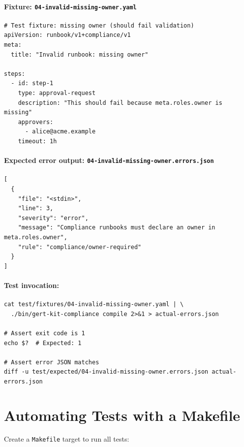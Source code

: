 \paragraph{Fixture: \texttt{04-invalid-missing-owner.yaml}}

\begin{verbatim}
# Test fixture: missing owner (should fail validation)
apiVersion: runbook/v1+compliance/v1
meta:
  title: "Invalid runbook: missing owner"

steps:
  - id: step-1
    type: approval-request
    description: "This should fail because meta.roles.owner is missing"
    approvers:
      - alice@acme.example
    timeout: 1h
\end{verbatim}

\paragraph{Expected error output: \texttt{04-invalid-missing-owner.errors.json}}

\begin{verbatim}
[
  {
    "file": "<stdin>",
    "line": 3,
    "severity": "error",
    "message": "Compliance runbooks must declare an owner in meta.roles.owner",
    "rule": "compliance/owner-required"
  }
]
\end{verbatim}

\paragraph{Test invocation:}

\begin{verbatim}
cat test/fixtures/04-invalid-missing-owner.yaml | \
  ./bin/gert-kit-compliance compile 2>&1 > actual-errors.json

# Assert exit code is 1
echo $?  # Expected: 1

# Assert error JSON matches
diff -u test/expected/04-invalid-missing-owner.errors.json actual-errors.json
\end{verbatim}

\section{Automating Tests with a Makefile}
\label{sec:makefile-tests}

Create a \texttt{Makefile} target to run all tests:

